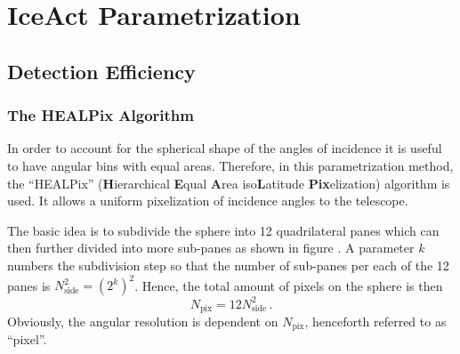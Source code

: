 \chapter{IceAct Parametrization}

\section{Detection Efficiency}

\subsection{The HEALPix Algorithm}

In order to account for the spherical shape of the angles of incidence it is useful to have angular bins with equal areas. Therefore, in this parametrization method, the \enquote{HEALPix} (\textbf{H}ierarchical \textbf{E}qual \textbf{A}rea iso\textbf{L}atitude \textbf{Pix}elization) algorithm is used. It allows a uniform pixelization of incidence angles to the telescope.\\


The basic idea is to subdivide the sphere into 12 quadrilateral panes which can then further divided into more sub-panes as shown in figure . A parameter $k$ numbers the subdivision step so that the number of sub-panes per each of the 12 panes is $N_{\text{side}}^2=\left(2^k\right)^2$. Hence, the total amount of pixels on the sphere is then
\[ N_\text{pix} = 12N_\text{side}^2\,. \]
Obviously, the angular resolution is dependent on $N_\text{pix}$, henceforth referred to as \enquote{pixel}.

